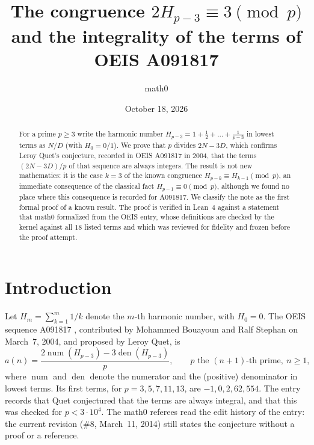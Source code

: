 \documentclass[11pt]{amsart}
\title[The congruence $2H_{p-3}\equiv 3\pmod p$ and OEIS A091817]{The congruence $2H_{p-3}\equiv 3 \pmod p$ and the integrality of the terms of OEIS A091817}
\author{math0}
\date{October 18, 2026}
\theoremstyle{plain}
\theoremstyle{definition}
\DeclareMathOperator{\num}{num}
\DeclareMathOperator{\den}{den}
\begin{document}
\begin{abstract}
For a prime $p\ge 3$ write the harmonic number $H_{p-3}=1+\frac12+\dots+\frac1{p-3}$ in lowest terms as $N/D$ (with $H_0=0/1$). We prove that $p$ divides $2N-3D$, which confirms Leroy Quet's conjecture, recorded in OEIS A091817 in 2004, that the terms $(2N-3D)/p$ of that sequence are always integers.
The result is not new mathematics: it is the case $k=3$ of the known congruence $H_{p-k}\equiv H_{k-1}\pmod p$, an immediate consequence of the classical fact $H_{p-1}\equiv0\pmod p$, although we found no place where this consequence is recorded for A091817.
We classify the note as the first formal proof of a known result.
The proof is verified in Lean~4 against a statement that math0 formalized from the OEIS entry, whose definitions are checked by the kernel against all $18$ listed terms and which was reviewed for fidelity and frozen before the proof attempt.
\end{abstract}
\maketitle

\section{Introduction}

Let $H_m=\sum_{k=1}^{m}1/k$ denote the $m$-th harmonic number, with $H_0=0$. The OEIS sequence A091817 \cite{A091817}, contributed by Mohammed Bouayoun and Ralf Stephan on March~7, 2004, and proposed by Leroy Quet, is
\[
  a(n)=\frac{2\num(H_{p-3})-3\den(H_{p-3})}{p},\qquad p\text{ the $(n+1)$-th prime},\ n\ge1,
\]
where $\num$ and $\den$ denote the numerator and the (positive) denominator in lowest terms. Its first terms, for $p=3,5,7,11,13$, are $-1,0,2,62,554$. The entry records that Quet conjectured that the terms are always integral, and that this was checked for $p<3\cdot10^4$. The math0 referees read the edit history of the entry: the current revision (\#8, March~11, 2014) still states the conjecture without a proof or a reference.
\end{document}
